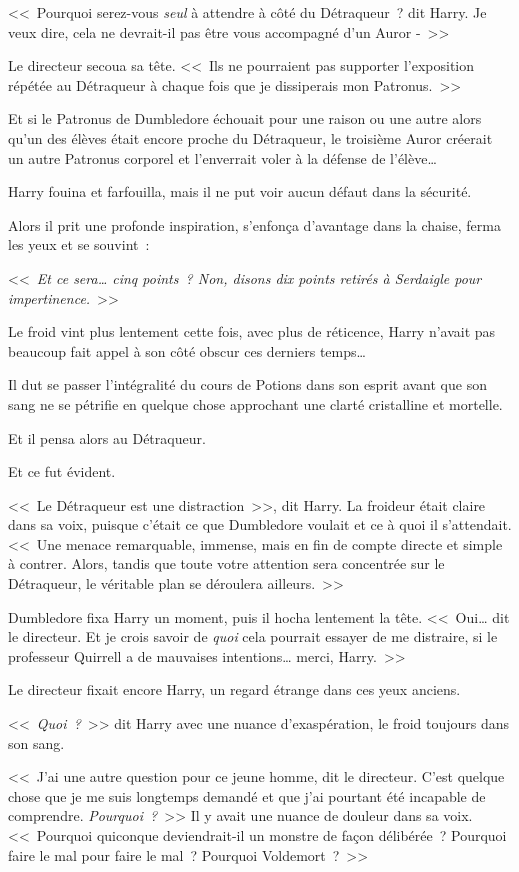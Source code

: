 <<~Pourquoi serez-vous \emph{seul} à attendre à côté du Détraqueur~? dit Harry. Je veux dire, cela ne devrait-il pas être vous accompagné d'un Auror -~>>

Le directeur secoua sa tête. <<~Ils ne pourraient pas supporter l'exposition répétée au Détraqueur à chaque fois que je dissiperais mon Patronus.~>>

Et si le Patronus de Dumbledore échouait pour une raison ou une autre alors qu'un des élèves était encore proche du Détraqueur, le troisième Auror créerait un autre Patronus corporel et l'enverrait voler à la défense de l'élève…

Harry fouina et farfouilla, mais il ne put voir aucun défaut dans la sécurité.

Alors il prit une profonde inspiration, s'enfonça d'avantage dans la chaise, ferma les yeux et se souvint~:

<<~\emph{Et ce sera… cinq points~? Non, disons dix points retirés à Serdaigle pour impertinence.}~>>

Le froid vint plus lentement cette fois, avec plus de réticence, Harry n'avait pas beaucoup fait appel à son côté obscur ces derniers temps…

Il dut se passer l'intégralité du cours de Potions dans son esprit avant que son sang ne se pétrifie en quelque chose approchant une clarté cristalline et mortelle.

Et il pensa alors au Détraqueur.

Et ce fut évident.

<<~Le Détraqueur est une distraction~>>, dit Harry. La froideur était claire dans sa voix, puisque c'était ce que Dumbledore voulait et ce à quoi il s'attendait. <<~Une menace remarquable, immense, mais en fin de compte directe et simple à contrer. Alors, tandis que toute votre attention sera concentrée sur le Détraqueur, le véritable plan se déroulera ailleurs.~>>

Dumbledore fixa Harry un moment, puis il hocha lentement la tête. <<~Oui… dit le directeur. Et je crois savoir de \emph{quoi} cela pourrait essayer de me distraire, si le professeur Quirrell a de mauvaises intentions… merci, Harry.~>>

Le directeur fixait encore Harry, un regard étrange dans ces yeux anciens.

<<~\emph{Quoi~?}~>> dit Harry avec une nuance d'exaspération, le froid toujours dans son sang.

<<~J'ai une autre question pour ce jeune homme, dit le directeur. C'est quelque chose que je me suis longtemps demandé et que j'ai pourtant été incapable de comprendre. \emph{Pourquoi~?}~>> Il y avait une nuance de douleur dans sa voix. <<~Pourquoi quiconque deviendrait-il un monstre de façon délibérée~? Pourquoi faire le mal pour faire le mal~? Pourquoi Voldemort~?~>>

